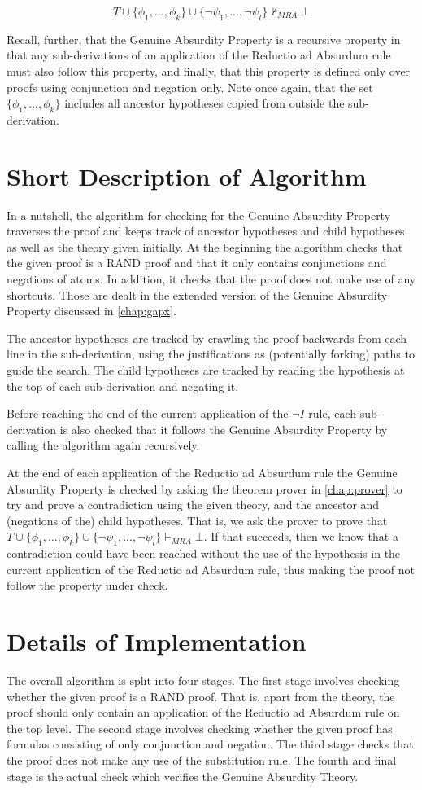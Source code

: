 \documentclass[11pt,twoside,a4paper]{report}
\begin{document}
\[T\cup\{\phi_1, ..., \phi_k\}\cup\{\neg\psi_1, ..., \neg\psi_l\}\nvdash_{MRA}\bot\]

Recall, further, that the Genuine Absurdity Property is a recursive property in that any sub-derivations of an application of the Reductio ad Absurdum rule must also follow this property, and finally, that this property is defined only over proofs using conjunction and negation only. Note once again, that the set $\{\phi_1, ..., \phi_k\}$ includes all ancestor hypotheses copied from outside the sub-derivation.

\section{Short Description of Algorithm}
In a nutshell, the algorithm for checking for the Genuine Absurdity Property traverses the proof and keeps track of ancestor hypotheses and child hypotheses as well as the theory given initially. At the beginning the algorithm checks that the given proof is a RAND proof and that it only contains conjunctions and negations of atoms. In addition, it checks that the proof does not make use of any shortcuts. Those are dealt in the extended version of the Genuine Absurdity Property discussed in \autoref{chap:gapx}.

The ancestor hypotheses are tracked by crawling the proof backwards from each line in the sub-derivation, using the justifications as (potentially forking) paths to guide the search. The child hypotheses are tracked by reading the hypothesis at the top of each sub-derivation and negating it.

Before reaching the end of the current application of the $\neg I$ rule, each sub-derivation is also checked that it follows the Genuine Absurdity Property by calling the algorithm again recursively.

At the end of each application of the Reductio ad Absurdum rule the Genuine Absurdity Property is checked by asking the theorem prover in \autoref{chap:prover} to try and prove a contradiction using the given theory, and the ancestor and (negations of the) child hypotheses. That is, we ask the prover to prove that $T\cup\{\phi_1, ..., \phi_k\}\cup\{\neg\psi_1, ..., \neg\psi_l\}\vdash_{MRA}\bot$. If that succeeds, then we know that a contradiction could have been reached without the use of the hypothesis in the current application of the Reductio ad Absurdum rule, thus making the proof not follow the property under check.

\section{Details of Implementation}
The overall algorithm is split into four stages. The first stage involves checking whether the given proof is a RAND proof. That is, apart from the theory, the proof should only contain an application of the Reductio ad Absurdum rule on the top level. The second stage involves checking whether the given proof has formulas consisting of only conjunction and negation. The third stage checks that the proof does not make any use of the substitution rule. The fourth and final stage is the actual check which verifies the Genuine Absurdity Theory.
\end{document}
